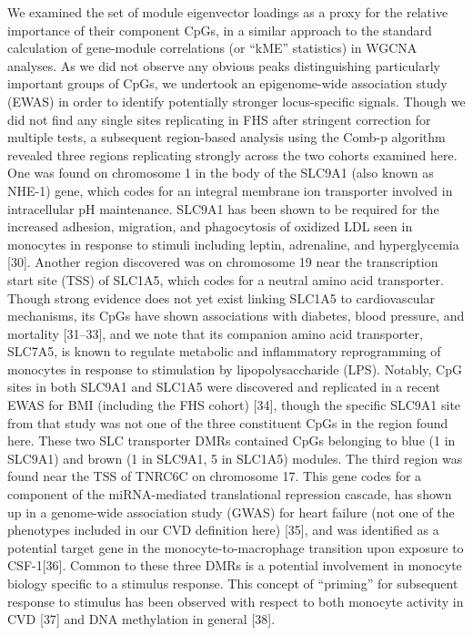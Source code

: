 \documentclass[]{bmcart}
\theoremstyle{definition}
\theoremstyle{definition}
\theoremstyle{definition}
\theoremstyle{remark}
\begin{document}
We examined the set of module eigenvector loadings as a proxy for the
relative importance of their component CpGs, in a similar approach to
the standard calculation of gene-module correlations (or ``kME''
statistics) in WGCNA analyses. As we did not observe any obvious peaks
distinguishing particularly important groups of CpGs, we undertook an
epigenome-wide association study (EWAS) in order to identify potentially
stronger locus-specific signals. Though we did not find any single sites
replicating in FHS after stringent correction for multiple tests, a
subsequent region-based analysis using the Comb-p algorithm revealed
three regions replicating strongly across the two cohorts examined here.
One was found on chromosome 1 in the body of the SLC9A1 (also known as
NHE-1) gene, which codes for an integral membrane ion transporter
involved in intracellular pH maintenance. SLC9A1 has been shown to be
required for the increased adhesion, migration, and phagocytosis of
oxidized LDL seen in monocytes in response to stimuli including leptin,
adrenaline, and hyperglycemia {[}30{]}. Another region discovered was on
chromosome 19 near the transcription start site (TSS) of SLC1A5, which
codes for a neutral amino acid transporter. Though strong evidence does
not yet exist linking SLC1A5 to cardiovascular mechanisms, its CpGs have
shown associations with diabetes, blood pressure, and mortality
{[}31--33{]}, and we note that its companion amino acid transporter,
SLC7A5, is known to regulate metabolic and inflammatory reprogramming of
monocytes in response to stimulation by lipopolysaccharide (LPS).
Notably, CpG sites in both SLC9A1 and SLC1A5 were discovered and
replicated in a recent EWAS for BMI (including the FHS cohort) {[}34{]},
though the specific SLC9A1 site from that study was not one of the three
constituent CpGs in the region found here. These two SLC transporter
DMRs contained CpGs belonging to blue (1 in SLC9A1) and brown (1 in
SLC9A1, 5 in SLC1A5) modules. The third region was found near the TSS of
TNRC6C on chromosome 17. This gene codes for a component of the
miRNA-mediated translational repression cascade, has shown up in a
genome-wide association study (GWAS) for heart failure (not one of the
phenotypes included in our CVD definition here) {[}35{]}, and was
identified as a potential target gene in the monocyte-to-macrophage
transition upon exposure to CSF-1{[}36{]}. Common to these three DMRs is
a potential involvement in monocyte biology specific to a stimulus
response. This concept of ``priming'' for subsequent response to
stimulus has been observed with respect to both monocyte activity in CVD
{[}37{]} and DNA methylation in general {[}38{]}.
\end{document}
